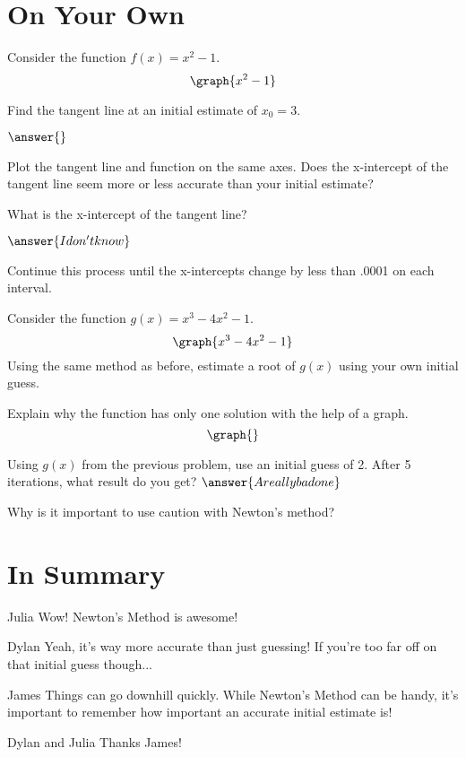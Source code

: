 \documentclass{ximera}
\begin{document}
\section{On Your Own}
\begin{question}
Consider the function $f(x) = x^2-1$.
\[
\graph{x^2-1}
\]

Find the tangent line at an initial estimate of $x_0=3$.

$\answer{}$

Plot the tangent line and function on the same axes. Does the x-intercept of the tangent line seem more or less accurate than your initial estimate?

\begin{multipleChoice}
\end{multipleChoice}

What is the x-intercept of the tangent line?

$\answer{I don't know}$

Continue this process until the x-intercepts change by less than .0001 on each interval.
\end{question}
Consider the function $g(x) = x^3-4x^2-1$.
\[
\graph{x^3-4x^2-1}
\]
Using the same method as before, estimate a root of $g(x)$ using your own initial guess.

Explain why the function has only one solution with the help of a graph.
\[
\graph{}
\]
\begin{freeResponse}
\end{freeResponse}
Using $g(x)$ from the previous problem, use an initial guess of 2. After 5 iterations, what result do you get?
$\answer{A really bad one}$

Why is it important to use caution with Newton's method?
\begin{freeResponse}
\end{freeResponse}
\section{In Summary}
\begin{dialogue}
\item[Julia] Wow! Newton's Method is awesome!
\item[Dylan] Yeah, it's way more accurate than just guessing! If you're too far off on that initial guess though...
\item[James] Things can go downhill quickly. While Newton's Method can be handy, it's important to remember how important an accurate initial estimate is!
\item[Dylan and Julia] Thanks James!
\end{dialogue}
\end{document}
